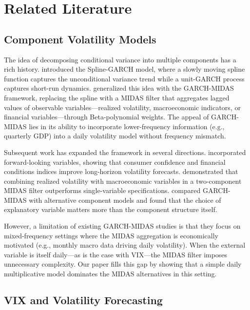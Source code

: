 \documentclass[12pt,a4paper]{article}
\begin{document}
\section{Related Literature}
\label{sec:literature}

\subsection{Component Volatility Models}

The idea of decomposing conditional variance into multiple components has a rich history. \citet{engle2008} introduced the Spline-GARCH model, where a slowly moving spline function captures the unconditional variance trend while a unit-GARCH process captures short-run dynamics. \citet{engle2013} generalized this idea with the GARCH-MIDAS framework, replacing the spline with a MIDAS filter that aggregates lagged values of observable variables---realized volatility, macroeconomic indicators, or financial variables---through Beta-polynomial weights. The appeal of GARCH-MIDAS lies in its ability to incorporate lower-frequency information (e.g., quarterly GDP) into a daily volatility model without frequency mismatch.

Subsequent work has expanded the framework in several directions. \citet{conrad2015} incorporated forward-looking variables, showing that consumer confidence and financial conditions indices improve long-horizon volatility forecasts. \citet{conrad2020} demonstrated that combining realized volatility with macroeconomic variables in a two-component MIDAS filter outperforms single-variable specifications. \citet{wang2017} compared GARCH-MIDAS with alternative component models and found that the choice of explanatory variable matters more than the component structure itself.

However, a limitation of existing GARCH-MIDAS studies is that they focus on mixed-frequency settings where the MIDAS aggregation is economically motivated (e.g., monthly macro data driving daily volatility). When the external variable is itself daily---as is the case with VIX---the MIDAS filter imposes unnecessary complexity. Our paper fills this gap by showing that a simple daily multiplicative model dominates the MIDAS alternatives in this setting.

\subsection{VIX and Volatility Forecasting}
\end{document}
